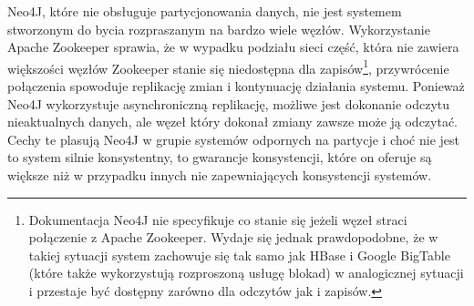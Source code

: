 Neo4J, które nie obsługuje partycjonowania danych, nie jest systemem stworzonym do bycia rozpraszanym na bardzo wiele węzłów.
Wykorzystanie Apache Zookeeper sprawia, że w wypadku podziału sieci część, która nie zawiera większości węzłów Zookeeper stanie się niedostępna dla zapisów\footnote{Dokumentacja Neo4J nie specyfikuje co stanie się jeżeli węzeł straci połączenie z Apache Zookeeper. Wydaje się jednak prawdopodobne, że w takiej sytuacji system zachowuje się tak samo jak HBase i Google BigTable (które także wykorzystują rozproszoną usługę blokad) w analogicznej sytuacji i przestaje być dostępny zarówno dla odczytów jak i zapisów.}, przywrócenie połączenia spowoduje replikację zmian i kontynuację działania systemu.
Ponieważ Neo4J wykorzystuje asynchroniczną replikację, możliwe jest dokonanie odczytu nieaktualnych danych, ale węzeł który dokonał zmiany zawsze może ją odczytać.
Cechy te plasują Neo4J w grupie systemów odpornych na partycje i choć nie jest to system silnie konsystentny, to gwarancje konsystencji, które on oferuje są większe niż w przypadku innych nie zapewniających konsystencji systemów.
